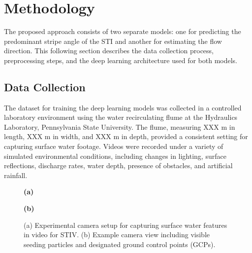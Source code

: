 \documentclass[12pt]{elsarticle}
\begin{document}
\section{Methodology}
\label{sec:Methodology}
The proposed approach consists of two separate models: one for predicting the predominant stripe angle of the STI and another for estimating the flow direction. This following section describes the data collection process, preprocessing steps, and the deep learning architecture used for both models.
\subsection{Data Collection}
The dataset for training the deep learning models was collected in a controlled laboratory environment using the water recirculating flume at the Hydraulics Laboratory, Pennsylvania State University. The flume, measuring XXX m in length, XXX m in width, and XXX m in depth, provided a consistent setting for capturing surface water footage. Videos were recorded under a variety of simulated environmental conditions, including changes in lighting, surface reflections, discharge rates, water depth, presence of obstacles, and artificial rainfall.
\begin{figure}[!htbp]
    \centering
    \begin{minipage}[b]{0.48\textwidth}
        \centering
        \setlength{\fboxsep}{0pt}
        \textbf{(a)} 
    \end{minipage}
    \hfill
    \begin{minipage}[b]{0.48\textwidth}
        \centering
        \setlength{\fboxsep}{0pt}
        \textbf{(b)}
    \end{minipage}
    \caption{(a) Experimental camera setup for capturing surface water features in video for STIV. (b) Example camera view including visible seeding particles and designated ground control points (GCPs).}
    \label{fig:camera_setup}
\end{figure}
\end{document}
